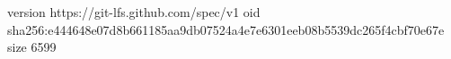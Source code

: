 version https://git-lfs.github.com/spec/v1
oid sha256:e444648e07d8b661185aa9db07524a4e7e6301eeb08b5539dc265f4cbf70e67e
size 6599
